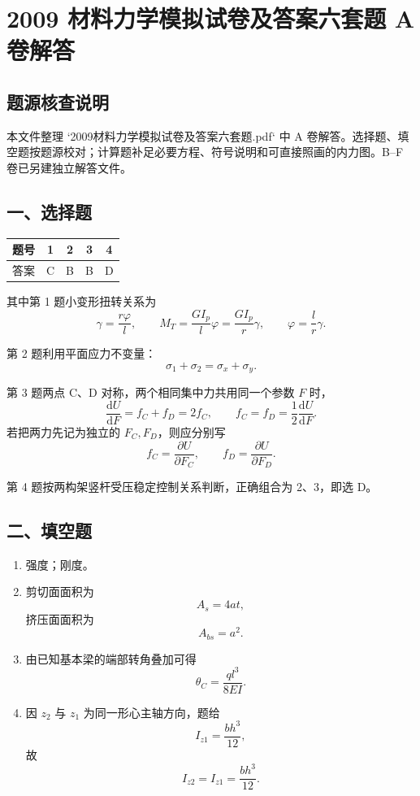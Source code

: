 \documentclass[11pt,a4paper]{ctexrep}
\newcommand{\assetdir}{}
\begin{document}
\chapter{2009 材料力学模拟试卷及答案六套题 A 卷解答}
{
\renewcommand{\assetdir}{../../考题_按知识点整理/visual_assets/question_crops/2009_2009材料力学模拟试卷及答案六套题}


\vspace{-1.0cm}

\section*{题源核查说明}

本文件整理 `2009材料力学模拟试卷及答案六套题.pdf` 中 A 卷解答。选择题、填空题按题源校对；计算题补足必要方程、符号说明和可直接照画的内力图。B--F 卷已另建独立解答文件。

\section*{一、选择题}

\begin{center}
\begin{tabular}{c c c c c}
\toprule
题号 & 1 & 2 & 3 & 4\\
\midrule
答案 & C & B & B & D\\
\bottomrule
\end{tabular}
\end{center}

其中第 1 题小变形扭转关系为
\[
    \gamma=\frac{r\varphi}{l},\qquad
    M_T=\frac{GI_p}{l}\varphi=\frac{GI_p}{r}\gamma,
    \qquad
    \varphi=\frac{l}{r}\gamma .
\]

第 2 题利用平面应力不变量：
\[
    \sigma_1+\sigma_2=\sigma_x+\sigma_y.
\]

第 3 题两点 C、D 对称，两个相同集中力共用同一个参数 $F$ 时，
\[
    \frac{\mathrm d U}{\mathrm d F}=f_C+f_D=2f_C,
    \qquad
    f_C=f_D=\frac{1}{2}\frac{\mathrm d U}{\mathrm d F}.
\]
若把两力先记为独立的 $F_C,F_D$，则应分别写
\[
    f_C=\frac{\partial U}{\partial F_C},\qquad
    f_D=\frac{\partial U}{\partial F_D}.
\]

第 4 题按两构架竖杆受压稳定控制关系判断，正确组合为 2、3，即选 D。

\section*{二、填空题}

\begin{enumerate}
    \item 强度；刚度。
    \item 剪切面面积为
    \[
        A_s=4at,
    \]
    挤压面面积为
    \[
        A_{bs}=a^2.
    \]
    \item 由已知基本梁的端部转角叠加可得
    \[
        \theta_C=\frac{q l^3}{8EI}.
    \]
    \item 因 $z_2$ 与 $z_1$ 为同一形心主轴方向，题给
    \[
        I_{z1}=\frac{bh^3}{12},
    \]
    故
    \[
        I_{z2}=I_{z1}=\frac{bh^3}{12}.
    \]
\end{enumerate}

}
\end{document}
